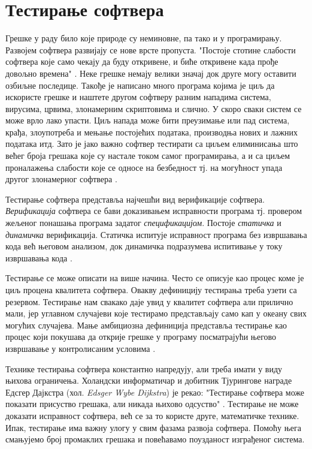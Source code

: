 \documentclass[12pt,oneside]{memoir}
\begin{document}
\chapter{Тестирање софтвера}

Грешке у раду било које природе су неминовне, па тако и у програмирању. Развојем софтвера развијају се нове врсте пропуста. "Постоје стотине слабости софтвера које само чекају да буду откривене, и биће откривене када прође довољно времена" \cite{fuzzing}. Неке грешке немају велики значај док друге могу оставити озбиљне последице. Такође је написано много програма којима је циљ да искористе грешке и наштете другом софтверу разним нападима система, вирусима, црвима, злонамерним скриптовима и слично. У скоро сваки систем се може врло лако упасти. Циљ напада може бити преузимање или пад система, крађа, злоупотреба и мењање постојећих података, производња нових и лажних података итд. Зато је јако важно софтвер тестирати са циљем елиминисања што већег броја грешака које су настале током самог програмирања, а и са циљем проналажења слабости које се односе на безбедност тј. на могућност упада другог злонамерног софтвера \cite{fuzzing, bezbMalkov}.

Тестирање софтвера представља најчешћи вид верификације софтвера. \textit{Верификација} софтвера се бави доказивањем исправности програма тј. провером жељеног понашања програма задатог \textit{спецификацијом}. Постоје \textit{статичка} и \textit{динамичка} верификација. Статичка испитује исправност програма без извршавања кода већ његовом анализом, док динамичка подразумева испитивање у току извршавања кода \cite{milenaDokt}. 

Тестирање се може описати на више начина. Често се описује као процес коме је циљ процена квалитета софтвера. Овакву дефиницију тестирања треба узети са резервом. Тестирање нам свакако даје увид у квалитет софтвера али прилично мали, јер углавном случајеви које тестирамо представљају само кап у океану свих могућих случајева. Мање амбициозна дефиниција представља тестирање као процес који покушава да открије грешке у програму посматрајући његово извршавање у контролисаним условима \cite{testPrinc}.

Технике тестирања софтвера константно напредују, али треба имати у виду њихова ограничења. Холандски информатичар и добитник Тјурингове награде Едсгер Дајкстра (хол. \textit{Edsger Wybe Dijkstra}) је рекао: "Тестирање софтвера може показати присуство грешака, али никада њихово одсуство" \cite{testPrinc}. Тестирање не може доказати исправност софтвера, већ се за то користе друге, математичке технике. Ипак, тестирање има важну улогу у свим фазама развоја софтвера. Помоћу њега смањујемо број промаклих грешака и повећавамо поузданост изграђеног система.
\end{document}
